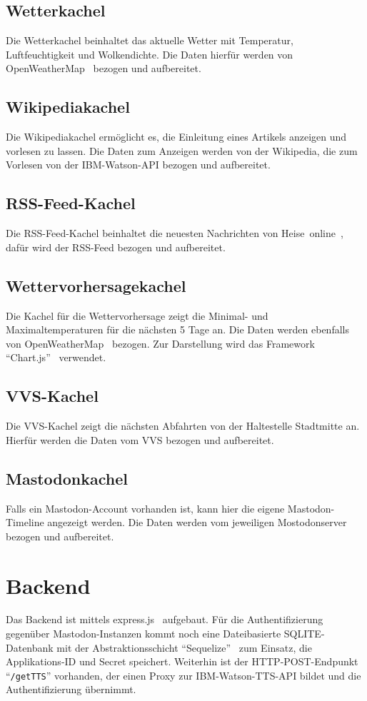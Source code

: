 \documentclass[fleqn,10pt]{SelfArx} %
\begin{document}
\subsection{Wetterkachel}
Die Wetterkachel beinhaltet das aktuelle Wetter mit Temperatur, Luftfeuchtigkeit und Wolkendichte. Die Daten hierfür werden von OpenWeatherMap~\cite{owm} bezogen und aufbereitet.
\subsection{Wikipediakachel}
Die Wikipediakachel ermöglicht es, die Einleitung eines Artikels anzeigen und vorlesen zu lassen. Die Daten zum Anzeigen werden von der Wikipedia, die zum Vorlesen von der IBM-Watson-API bezogen und aufbereitet.
\subsection{RSS-Feed-Kachel}
Die RSS-Feed-Kachel beinhaltet die neuesten Nachrichten von Heise~online~\cite{heise}, dafür wird der RSS-Feed bezogen und aufbereitet.
\subsection{Wettervorhersagekachel}
Die Kachel für die Wettervorhersage zeigt die Minimal- und Maximaltemperaturen für die nächsten 5 Tage an. Die Daten werden ebenfalls von OpenWeatherMap~\cite{owm} bezogen. Zur Darstellung wird das Framework \enquote{Chart.js}~\cite{chartjs} verwendet.
\subsection{VVS-Kachel}
Die VVS-Kachel zeigt die nächsten Abfahrten von der Haltestelle Stadtmitte an. Hierfür werden die Daten vom VVS bezogen und aufbereitet.
\subsection{Mastodonkachel}
Falls ein Mastodon-Account vorhanden ist, kann hier die eigene Mastodon-Timeline angezeigt werden. Die Daten werden vom jeweiligen Mostodonserver bezogen und aufbereitet.
\section{Backend}
Das Backend ist mittels express.js~\cite{express} aufgebaut. Für die Authentifizierung gegenüber Mastodon-Instanzen kommt noch eine Dateibasierte SQLITE-Datenbank mit der Abstraktionsschicht \enquote{Sequelize}~\cite{sequelize} zum Einsatz, die Applikations-ID und Secret speichert. Weiterhin ist der HTTP-POST-Endpunkt \enquote{\texttt{/getTTS}} vorhanden, der einen Proxy zur IBM-Watson-TTS-API bildet und die Authentifizierung übernimmt.
\end{document}
